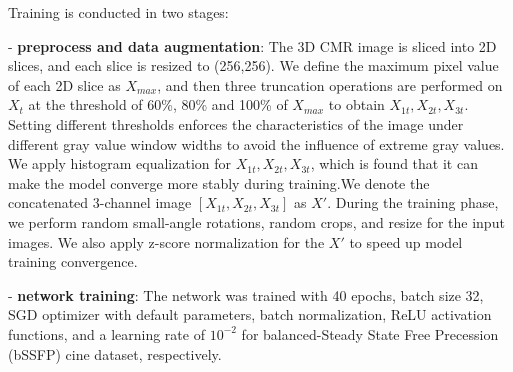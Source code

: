 \documentclass[runningheads]{llncs}
\begin{document}
Training is conducted in two stages:

- \textbf{preprocess and data augmentation}: The 3D CMR image is sliced into 2D slices, and each slice is resized to (256,256). We define the maximum pixel value of each 2D slice as $X_{max}$, and then three truncation operations are performed on $X_t$ at the threshold of 60\%, 80\% and 100\% of $X_{max}$ to obtain $X_{1t},X_{2t},X_{3t}$. Setting different thresholds enforces the characteristics of the image under different gray value window widths to avoid the influence of extreme gray values. We apply histogram equalization for $X_{1t},X_{2t},X_{3t}$, which is found that it can make the model converge more stably during training.We denote the concatenated 3-channel image $[X_{1t}, X_{2t}, X_{3t}]$ as $X'$. During the training phase, we perform random small-angle rotations, random crops, and resize for the input images. We also apply z-score normalization for the $X'$ to speed up model training convergence.

- \textbf{network training}: The network was trained with 40 epochs, batch size 32, SGD optimizer with default parameters, batch normalization, ReLU activation functions, and a learning rate of $10^{-2}$ for balanced-Steady State Free Precession (bSSFP) cine dataset, respectively.
\end{document}
